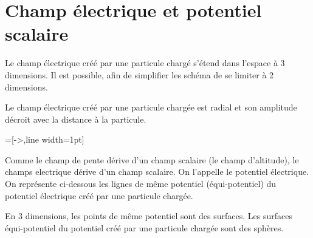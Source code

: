 
\section{Champ électrique et potentiel scalaire}
%
Le champ électrique créé par une particule chargé s'étend dans l'espace à 3 dimensions. Il est possible, afin de simplifier les schéma de se limiter à 2 dimensions.

Le champ électrique créé par une particule chargée est radial et son amplitude décroit avec la distance à la particule.

\begin{center}
=[->,line width=1pt]
\end{center}


Comme le champ de pente dérive d'un champ scalaire (le champ d'altitude), le champs electrique dérive d'un champ scalaire. On l'appelle le potentiel électrique. On représente ci-dessous les lignes de même potentiel (équi-potentiel) du potentiel électrique créé par une particule chargée.

\begin{center}
\end{center}

En 3 dimensions, les points de même potentiel sont des surfaces. Les surfaces équi-potentiel du potentiel créé par une particule chargée sont des sphères.

